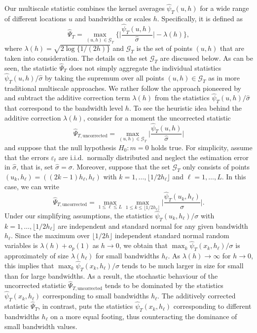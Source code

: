 Our multiscale statistic combines the kernel averages $\widehat{\psi}_T(u,h)$ for a wide range of different locations $u$ and bandwidths or scales $h$. Specifically, it is defined as
\begin{equation}\label{multiscale-stat}
\widehat{\Psi}_T = \max_{(u,h) \in \mathcal{G}_T} \Big\{ \Big|\frac{\widehat{\psi}_T(u,h)}{\widehat{\sigma}}\Big| - \lambda(h) \Big\}, 
\end{equation} 
where $\lambda(h) = \sqrt{2 \log \{ 1/(2h) \}}$ and $\mathcal{G}_T$ is the set of points $(u,h)$ that are taken into consideration. The details on the set $\mathcal{G}_T$ are discussed below. As can be seen, the statistic $\widehat{\Psi}_T$ does not simply aggregate the individual statistics $\widehat{\psi}_T(u,h)/\widehat{\sigma}$ by taking the supremum over all points $(u,h) \in \mathcal{G}_T$ as in more traditional multiscale approaches. We rather follow the approach pioneered by \cite{DuembgenSpokoiny2001} and subtract the additive correction term $\lambda(h)$ from the statistics $\widehat{\psi}_T(u,h)/\widehat{\sigma}$ that correspond to the bandwidth level $h$. To see the heuristic idea behind the additive correction $\lambda(h)$, consider for a moment the uncorrected statistic
\[ \widehat{\Psi}_{T,\text{uncorrected}} = \max_{(u,h) \in \mathcal{G}_T} \Big|\frac{\widehat{\psi}_T(u,h)}{\widehat{\sigma}}\Big| \]
and suppose that the null hypothesis $H_0: m = 0$ holds true. For simplicity, assume that the errors $\varepsilon_t$ are i.i.d.\ normally distributed and neglect the estimation error in $\widehat{\sigma}$, that is, set $\widehat{\sigma} = \sigma$. Moreover, suppose that the set $\mathcal{G}_T$ only consists of points $(u_k,h_\ell) = ((2k - 1)h_\ell,h_\ell)$ with $k = 1,\ldots,\lfloor 1/2h_\ell \rfloor$ and $\ell = 1,\ldots,L$. In this case, we can write
\[ \widehat{\Psi}_{T,\text{uncorrected}} = \max_{1 \le \ell \le L} \max_{1 \le k \le \lfloor 1/2h_\ell \rfloor} \Big|\frac{\widehat{\psi}_T(u_k,h_\ell)}{\sigma}\Big|. \]
Under our simplifying assumptions, the statistics $\widehat{\psi}_T(u_k,h_\ell)/\sigma$ with $k = 1,\ldots,\lfloor 1/2h_\ell \rfloor$ are independent and standard normal for any given bandwidth $h_\ell$. Since the maximum over $\lfloor 1/2h \rfloor$ independent standard normal random variables is $\lambda(h) + o_p(1)$ as $h \rightarrow 0$, we obtain that $\max_{k} \widehat{\psi}_T(x_k,h_\ell)/\sigma$ is approximately of size $\lambda(h_\ell)$ for small bandwidths $h_\ell$. As $\lambda(h) \rightarrow \infty$ for $h \rightarrow 0$, this implies that $\max_{k} \widehat{\psi}_T(x_k,h_\ell)/\sigma$ tends to be much larger in size for small than for large bandwidths. As a result, the stochastic behaviour of the uncorrected statistic $\widehat{\Psi}_{T,\text{uncorrected}}$ tends to be dominated by the statistics $\widehat{\psi}_T(x_k,h_\ell)$ corresponding to small bandwidths $h_\ell$. The additively corrected statistic $\widehat{\Psi}_T$, in contrast, puts the statistics $\widehat{\psi}_T(x_k,h_\ell)$ corresponding to different bandwidths $h_\ell$ on a more equal footing, thus counteracting the dominance of small bandwidth values. 


